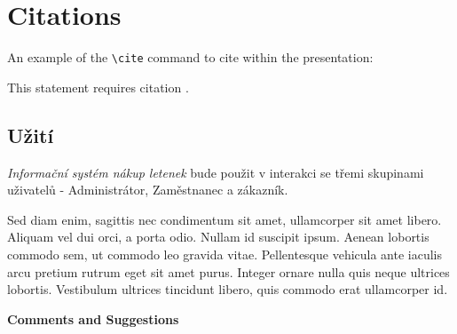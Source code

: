 \documentclass[
paper=landscape,
paper=160mm:90mm, %
fontsize=11pt, %
pagesize, %
parskip=half-, %
]{scrartcl} %
\newcommand*{\mygreen}[1]{\textcolor{mygreen}{#1}}
\newcommand*{\myblue}[1]{\textcolor{myblue}{#1}}
\newcommand*{\mybrown}[1]{\textcolor{mybrown}{#1}}
\newcommand*{\myred}[1]{\textcolor{myred}{#1}}
\theoremstyle{mythmstyle} %
\begin{document}
\clearpage


\section*{Citations}

An example of the \texttt{\textbackslash cite} command to cite within the presentation:

This statement requires citation \cite{Smith:2012qr}.

\clearpage

\subsection*{Užití}

\textit{Informační systém nákup letenek} bude použit v interakci se třemi skupinami uživatelů - Administrátor, Zaměstnanec a zákazník. 

\begin{multicols}{3} %
\mygreen{Sed diam enim, sagittis nec} condimentum sit amet, ullamcorper sit amet libero. \mybrown{Aliquam vel dui orci}, a porta odio. \myred{Nullam id suscipit} ipsum. \myblue{Aenean lobortis} commodo sem, ut commodo leo gravida vitae. Pellentesque vehicula ante iaculis arcu pretium rutrum eget sit amet purus. Integer ornare nulla quis neque ultrices lobortis. Vestibulum ultrices tincidunt libero, quis commodo erat ullamcorper id.
\end{multicols}

\clearpage
\thispagestyle{empty} %




\clearpage


\thispagestyle{empty} %

\begin{flushright}
\vspace{0.6cm}
\color{white}\sffamily
{\bfseries\LARGE Comments and Suggestions\par} %
\vfill
\end{flushright}

\end{document}
